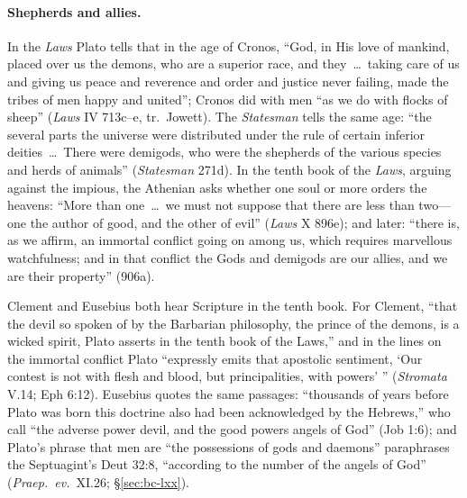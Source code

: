 \paragraph{Shepherds and allies.} In the \emph{Laws} Plato tells that in
the age of Cronos, ``God, in His love of mankind, placed over us the
demons, who are a superior race, and they~\dots\ taking care of us and
giving us peace and reverence and order and justice never failing, made
the tribes of men happy and united''; Cronos did with men ``as we do with flocks of
sheep'' (\emph{Laws} IV 713c--e, tr.\ Jowett). The \emph{Statesman}
tells the same age: ``the several parts the universe were distributed
under the rule of certain inferior deities~\dots\ There were demigods,
who were the shepherds of the various species and herds of animals''
(\emph{Statesman} 271d). In the tenth book of the \emph{Laws}, arguing
against the impious, the Athenian asks whether one soul or more orders
the heavens: ``More than one~\dots\ we must not suppose that there are
less than two---one the author of good, and the other of evil''
(\emph{Laws} X 896e); and later: ``there is, as we affirm, an immortal
conflict going on among us, which requires marvellous watchfulness; and
in that conflict the Gods and demigods are our allies, and we are their
property'' (906a).

Clement and Eusebius both hear Scripture in the tenth book. For Clement,
``that the devil so spoken of by the Barbarian philosophy, the prince of
the demons, is a wicked spirit, Plato asserts in the tenth book of the
Laws,'' and in the lines on the immortal conflict Plato ``expressly
emits that apostolic sentiment, `Our contest is not with flesh and
blood, but principalities, with powers' '' (\emph{Stromata} V.14; Eph
6:12). Eusebius quotes the same passages: ``thousands of years before
Plato was born this doctrine also had been acknowledged by the
Hebrews,'' who call ``the adverse power devil, and the good powers
angels of God'' (Job 1:6); and Plato's phrase that men are ``the
possessions of gods and daemons'' paraphrases the Septuagint's Deut
32:8, ``according to the number of the angels of God'' (\emph{Praep.\
ev.}\ XI.26; \S\ref{sec:bc-lxx}).

